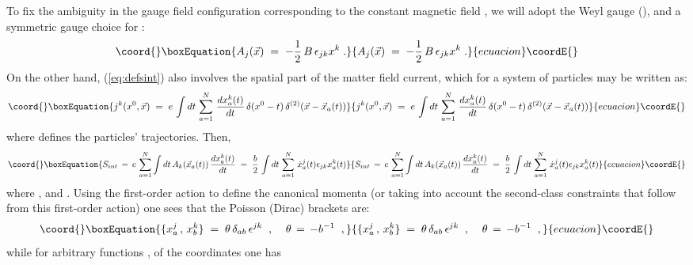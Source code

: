 \documentclass[a4paper,12pt]{article}
\begin{document}
To fix the ambiguity in the gauge field configuration corresponding
to
the constant magnetic field \coordHE{}, we will adopt the Weyl gauge
(\coordHE{}), and a symmetric gauge choice for \coordHE{}:
\begin{equation}\coord{}\boxEquation{
  \label{eq:symmg}
  A_j({\vec x}) \;=\; - \frac{1}{2} \,B\,\epsilon_{jk} x^k \;.
}{
  A_j({\vec x}) \;=\; - \frac{1}{2} \,B\,\epsilon_{jk} x^k \;.
}{ecuacion}\coordE{}\end{equation}
On the other hand, (\ref{eq:defsint}) also involves the spatial
part
of the matter field current, which for a system of \coordHE{} particles
may
be written as:
\begin{equation}\coord{}\boxEquation{
  \label{eq:defcur}
  j^k(x^0,{\vec x}) \;=\; e\, \int dt \, \sum_{a=1}^N \,
\frac{dx^k_a(t)}{dt} \,
\delta(x^0-t)\, \delta^{(2)}({\vec x}-{\vec x}_a (t))   
}{
  j^k(x^0,{\vec x}) \;=\; e\, \int dt \, \sum_{a=1}^N \,
\frac{dx^k_a(t)}{dt} \,
\delta(x^0-t)\, \delta^{(2)}({\vec x}-{\vec x}_a (t))   
}{ecuacion}\coordE{}\end{equation}
where \coordHE{} defines the particles'
trajectories.  Then,
\begin{equation}\coord{}\boxEquation{
  \label{eq:sint1}
S_{int} \,=\, e\, \sum_{a=1}^N \int dt \,A_k({\vec x}_a (t))\,
\frac{dx^k_a(t)}{dt} 
\;=\; \frac{b}{2} \, \int dt \, \sum_{a=1}^N \, {\dot x}^j_a(t)
\epsilon_{jk} x^k_a (t) 
}{
  S_{int} \,=\, e\, \sum_{a=1}^N \int dt \,A_k({\vec x}_a (t))\,
\frac{dx^k_a(t)}{dt} 
\;=\; \frac{b}{2} \, \int dt \, \sum_{a=1}^N \, {\dot x}^j_a(t)
\epsilon_{jk} x^k_a (t) 
}{ecuacion}\coordE{}\end{equation}
where \coordHE{}, and \coordHE{}. Using the first-order action
to define
the canonical momenta (or taking into account the second-class
constraints that follow from this first-order action) one sees that
the Poisson (Dirac) brackets are:
\begin{equation}\coord{}\boxEquation{
  \label{eq:dbs}
\{ x^j_a \,,\, x^k_b \}\;=\; \theta \, \delta_{ab} \, \epsilon^{jk}
\;\;,\;\;\;\; 
\theta \,=\, - b^{-1}\;\;,
}{
  \{ x^j_a \,,\, x^k_b \}\;=\; \theta \, \delta_{ab} \, \epsilon^{jk}
\;\;,\;\;\;\; 
\theta \,=\, - b^{-1}\;\;,
}{ecuacion}\coordE{}\end{equation}
while for arbitrary functions \coordHE{}, \coordHE{} of the coordinates one has
\end{document}

